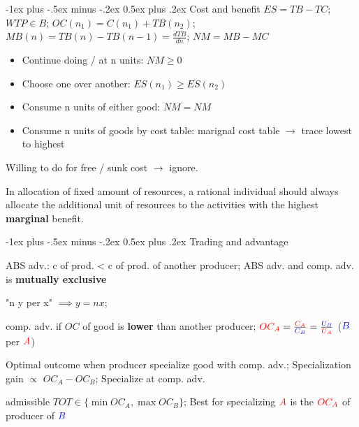 \documentclass[a4paper]{article}
\makeatletter
\renewcommand{\section}{\@startsection{section}{1}{0mm}%
                                {-1ex plus -.5ex minus -.2ex}%
                                {0.5ex plus .2ex}%
                                {\normalfont\large\bfseries}}
\makeatother
\begin{document}
\small

\begin{multicols*}{3}
    \section{Cost and benefit}
    $ES=TB-TC$; $WTP\in B$; $OC(n_1) = C(n_1) + TB(n_2)$; $MB(n) = TB(n)-TB(n-1) = \frac{dTB}{dn}$; $NM = MB - MC$

    \begin{itemize}
        \item Continue doing / at n units: $NM \geq 0$
        \item Choose one over another: $ES(n_1) \geq ES(n_2)$
        \item Consume n units of either good: $NM=NM$
        \item Consume n units of goods by cost table: marignal cost table $\to$ trace lowest to highest
    \end{itemize}

    Willing to do for free / sunk cost $\to$ ignore.

    \tiny

    In allocation of fixed amount of resources, a rational individual should always allocate the additional unit of resources to the activities with the highest \textbf{marginal} benefit.

    \normalsize

    \section{Trading and advantage}

    ABS adv.: c of prod. < c of prod. of another producer; ABS adv. and comp. adv. is \textbf{mutually exclusive}

    "n y per x" $\implies y = nx$;

    comp. adv. if $OC$ of good is \textbf{lower} than another producer; $\textcolor{red}{OC_{A}} = \frac{\textcolor{red}{C_A}}{\textcolor{blue}{C_B}} = \frac{\textcolor{blue}{U_B}}{\textcolor{red}{U_A}}$ ($\textcolor{blue}{B}$ per $\textcolor{red}{A}$)

    Optimal outcome when producer specialize good with comp. adv.; Specialization gain $\propto$ $OC_{A} - OC_{B}$; Specialize at comp. adv.

    admissible $TOT \in \{\min{OC_{A}}, \max{OC_{B}}\}$; Best for specializing $\textcolor{red}{A}$ is the $\textcolor{red}{OC_A}$ of producer of $\textcolor{blue}{B}$


\end{multicols*}
\end{document}
